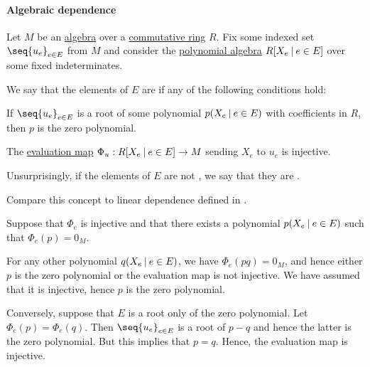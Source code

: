 \paragraph{Algebraic dependence}

\begin{definition}\label{def:algebraic_dependence}\mimprovised
  Let \( M \) be an \hyperref[def:algebra_over_ring]{algebra} over a \hyperref[def:ring/commutative]{commutative ring} \( R \). Fix some indexed set \( \seq{ u_e }_{e \in E} \) from \( M \) and consider the \hyperref[def:polynomial_algebra]{polynomial algebra} \( R[X_e \given e \in E] \) over some fixed indeterminates.

  We say that the elements of \( E \) are  if any of the following conditions hold:

  \begin{thmenum}
     If \( \seq{ u_e }_{e \in E} \) is a root of some polynomial \( p(X_e \given e \in E) \) with coefficients in \( R \), then \( p \) is the zero polynomial.

     The \hyperref[thm:polynomial_algebra_universal_property]{evaluation map} \( \Phi_u: R[X_e \given e \in E] \to M \) sending \( X_e \) to \( u_e \) is injective.
  \end{thmenum}

  Unsurprisingly, if the elements of \( E \) are not , we say that they are .
\end{definition}
\begin{comments}
  \item Compare this concept to linear dependence defined in .
\end{comments}
\begin{defproof}
   Suppose that \( \Phi_e \) is injective and that there exists a polynomial \( p(X_e \given e \in E) \) such that \( \Phi_e(p) = 0_M \).

  For any other polynomial \( q(X_e \given e \in E) \), we have \( \Phi_e(p q) = 0_M \), and hence either \( p \) is the zero polynomial or the evaluation map is not injective. We have assumed that it is injective, hence \( p \) is the zero polynomial.

   Conversely, suppose that \( E \) is a root only of the zero polynomial. Let \( \Phi_e(p) = \Phi_e(q) \). Then \( \seq{ u_e }_{e \in E} \) is a root of \( p - q \) and hence the latter is the zero polynomial. But this implies that \( p = q \). Hence, the evaluation map is injective.
\end{defproof}

